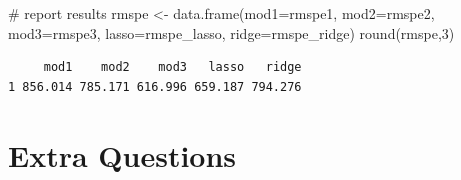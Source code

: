 \documentclass[
  letterpaper,
  DIV=11,
  numbers=noendperiod]{scrreprt}
\newenvironment{Shaded}{\begin{snugshade}}{\end{snugshade}}
\newcommand{\AttributeTok}[1]{\textcolor[rgb]{0.40,0.45,0.13}{#1}}
\newcommand{\CommentTok}[1]{\textcolor[rgb]{0.37,0.37,0.37}{#1}}
\newcommand{\DecValTok}[1]{\textcolor[rgb]{0.68,0.00,0.00}{#1}}
\newcommand{\FunctionTok}[1]{\textcolor[rgb]{0.28,0.35,0.67}{#1}}
\newcommand{\NormalTok}[1]{\textcolor[rgb]{0.00,0.23,0.31}{#1}}
\newcommand{\OtherTok}[1]{\textcolor[rgb]{0.00,0.23,0.31}{#1}}
\begin{document}
\begin{Shaded}
\begin{Highlighting}[]
\CommentTok{\# report results}
\NormalTok{rmspe }\OtherTok{\textless{}{-}} \FunctionTok{data.frame}\NormalTok{(}\AttributeTok{mod1=}\NormalTok{rmspe1, }\AttributeTok{mod2=}\NormalTok{rmspe2, }\AttributeTok{mod3=}\NormalTok{rmspe3, }\AttributeTok{lasso=}\NormalTok{rmspe\_lasso, }\AttributeTok{ridge=}\NormalTok{rmspe\_ridge)}
\FunctionTok{round}\NormalTok{(rmspe,}\DecValTok{3}\NormalTok{)}
\end{Highlighting}
\end{Shaded}

\begin{verbatim}
     mod1    mod2    mod3   lasso   ridge
1 856.014 785.171 616.996 659.187 794.276
\end{verbatim}

\section{Extra Questions}\label{extra-questions-3}
\end{document}
